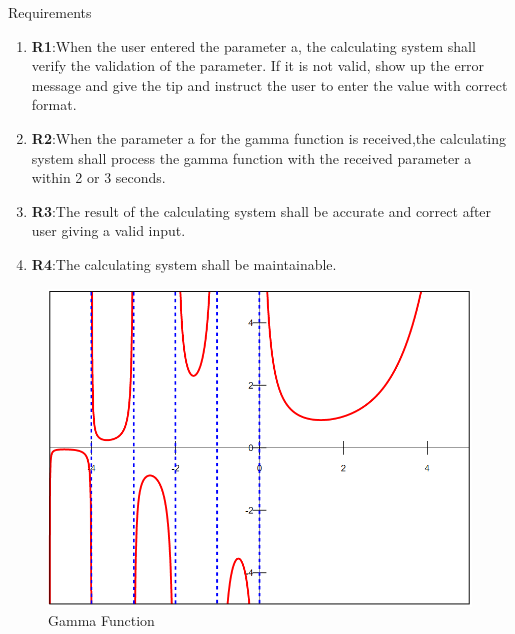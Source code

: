 \documentclass[final]{beamer}
\newlength{\onecolwid}
\begin{document}
\begin{frame}[t]
\begin{columns}[t]
\begin{column}{\onecolwid}

\begin{block}{Requirements}

\begin{enumerate}
\item \textbf{R1}:When the user entered the parameter a, the calculating system shall verify the validation of the parameter. If it is not valid, show up the error message and give the tip and instruct the user to enter the value with correct format.
\setlength{\itemsep}{6pt}
\item \textbf{R2}:When the parameter a for the gamma function is received,the calculating system shall process the gamma function with the received parameter a within  2 or 3 seconds.
\setlength{\itemsep}{6pt}
\item \textbf{R3}:The result of the calculating system shall be accurate and correct after user giving a valid input.
\setlength{\itemsep}{6pt}
\item \textbf{R4}:The calculating system shall be maintainable.
\end{enumerate}

\end{block}


\begin{figure}
\includegraphics[width=0.7\linewidth]{gamma.png}
\caption{Gamma Function}
\end{figure}


\end{column} %


\end{columns}
\end{frame}
\end{document}
